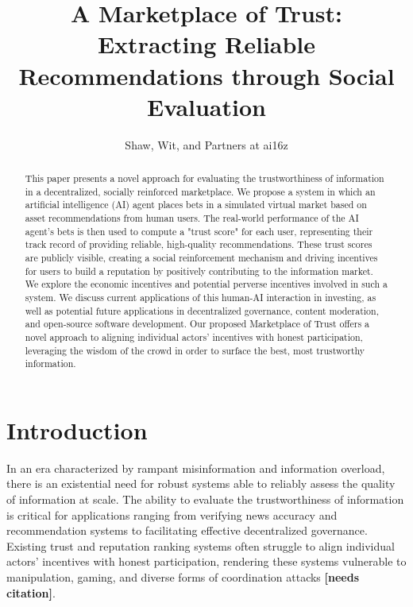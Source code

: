 \documentclass{article}
\title{A Marketplace of Trust: \\ 
Extracting Reliable Recommendations through Social Evaluation}
\author{Shaw, Wit, and Partners at ai16z}
\date{}
\begin{document}
\maketitle

\begin{abstract}
This paper presents a novel approach for evaluating the trustworthiness of information in a decentralized, socially reinforced marketplace. We propose a system in which an artificial intelligence (AI) agent places bets in a simulated virtual market based on asset recommendations from human users. The real-world performance of the AI agent's bets is then used to compute a "trust score" for each user, representing their track record of providing reliable, high-quality recommendations. These trust scores are publicly visible, creating a social reinforcement mechanism and driving incentives for users to build a reputation by positively contributing to the information market. We explore the economic incentives and potential perverse incentives involved in such a system. We discuss current applications of this human-AI interaction in investing, as well as potential future applications in decentralized governance, content moderation, and open-source software development. Our proposed Marketplace of Trust offers a novel approach to aligning individual actors' incentives with honest participation, leveraging the wisdom of the crowd in order to surface the best, most trustworthy information.
\end{abstract}

\section{Introduction}

In an era characterized by rampant misinformation and information overload, there is an existential need for robust systems able to reliably assess the quality of information at scale. The ability to evaluate the trustworthiness of information is critical for applications ranging from verifying news accuracy and recommendation systems to facilitating effective decentralized governance. Existing trust and reputation ranking systems often struggle to align individual actors' incentives with honest participation, rendering these systems vulnerable to manipulation, gaming, and diverse forms of coordination attacks \textbf{[\textbf{needs citation}]}.
\end{document}
